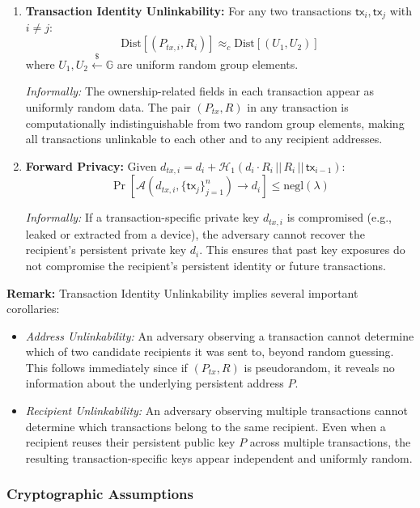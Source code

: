 \documentclass{article}
\begin{document}
\begin{enumerate}
\item \textbf{Transaction Identity Unlinkability:}
For any two transactions $\mathsf{tx}_i, \mathsf{tx}_j$ with $i \neq j$:
$$\text{Dist}[(P_{tx,i}, R_i)] \approx_c \text{Dist}[(U_1, U_2)]$$
where $U_1, U_2 \stackrel{\$}{\leftarrow} \mathbb{G}$ are uniform random group elements.

\textit{Informally:} The ownership-related fields in each transaction appear as uniformly random data. The pair $(P_{tx}, R)$ in any transaction is computationally indistinguishable from two random group elements, making all transactions unlinkable to each other and to any recipient addresses.

\item \textbf{Forward Privacy:}
Given $d_{tx,i} = d_i + \mathcal{H}_1(d_i \cdot R_i \,||\, R_i \,||\, \mathsf{tx}_{i-1})$:
$$\Pr\left[\mathcal{A}(d_{tx,i}, \{\mathsf{tx}_j\}_{j=1}^n) \rightarrow d_i\right] \leq \text{negl}(\lambda)$$

\textit{Informally:} If a transaction-specific private key $d_{tx,i}$ is compromised (e.g., leaked or extracted from a device), the adversary cannot recover the recipient's persistent private key $d_i$. This ensures that past key exposures do not compromise the recipient's persistent identity or future transactions.
\end{enumerate}

\textbf{Remark:} Transaction Identity Unlinkability implies several important corollaries:
\begin{itemize}
\item \emph{Address Unlinkability:} An adversary observing a transaction cannot determine which of two candidate recipients it was sent to, beyond random guessing. This follows immediately since if $(P_{tx}, R)$ is pseudorandom, it reveals no information about the underlying persistent address $P$.

\item \emph{Recipient Unlinkability:} An adversary observing multiple transactions cannot determine which transactions belong to the same recipient. Even when a recipient reuses their persistent public key $P$ across multiple transactions, the resulting transaction-specific keys appear independent and uniformly random.
\end{itemize}

\subsubsection{Cryptographic Assumptions}
\end{document}
